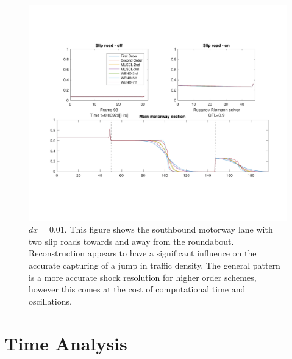 	\begin{figure}
    		\centering
        		\includegraphics[trim=57 110 40 100,clip,width=\textwidth]{M1J40_reco.pdf}
		\caption[Wakefield M1J40 : Density profile for varying reconstruction]{$dx=0.01$. This figure shows the southbound motorway lane with two slip roads towards and away from the roundabout. Reconstruction appears to have a significant influence on the accurate capturing of a jump in traffic density. The general pattern is a more accurate shock resolution for higher order schemes, however this comes at the cost of computational time and oscillations.}
		\label{fig:randd:M1J40:reco}
	\end{figure}

\section{Time Analysis}
\label{sec:randd:timeanalysis}

